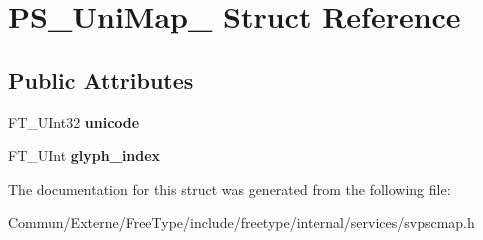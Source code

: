 \hypertarget{struct_p_s___uni_map__}{}\section{P\+S\+\_\+\+Uni\+Map\+\_\+ Struct Reference}
\label{struct_p_s___uni_map__}
\subsection*{Public Attributes}
\begin{DoxyCompactItemize}
\item 
F\+T\+\_\+\+U\+Int32 {\bfseries unicode}\hypertarget{struct_p_s___uni_map___a87c1f471eb4033fc5ed9d0f1ecaf35a1}{}\label{struct_p_s___uni_map___a87c1f471eb4033fc5ed9d0f1ecaf35a1}

\item 
F\+T\+\_\+\+U\+Int {\bfseries glyph\+\_\+index}\hypertarget{struct_p_s___uni_map___a0d5b2e3c405aeab1f1059a3587125cfd}{}\label{struct_p_s___uni_map___a0d5b2e3c405aeab1f1059a3587125cfd}

\end{DoxyCompactItemize}


The documentation for this struct was generated from the following file\+:\begin{DoxyCompactItemize}
\item 
Commun/\+Externe/\+Free\+Type/include/freetype/internal/services/svpscmap.\+h\end{DoxyCompactItemize}
